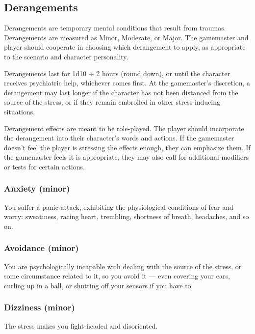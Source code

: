 \subsection{Derangements} \label{sec:derangements} 

Derangements are temporary mental conditions that result from traumas. Derangements are measured as Minor, Moderate, or Major. The gamemaster and player should cooperate in choosing which derangement to apply, as appropriate to the scenario and character personality. 

Derangements last for 1d10 $\div$ 2 hours (round down), or until the character receives psychiatric help, whichever comes first. At the gamemaster’s discretion, a derangement may last longer if the character has not been distanced from the source of the stress, or if they remain embroiled in other stress-inducing situations. 

Derangement effects are meant to be role-played. The player should incorporate the derangement into their character’s words and actions. If the gamemaster doesn’t feel the player is stressing the effects enough, they can emphasize them. If the gamemaster feels it is appropriate, they may also call for additional modifiers or tests for certain actions. 

\subsubsection{Anxiety (minor)} 

You suffer a panic attack, exhibiting the physiological conditions of fear and worry: sweatiness, racing heart, trembling, shortness of breath, headaches, and so on. 

\subsubsection{Avoidance (minor)} 

You are psychologically incapable with dealing with the source of the stress, or some circumstance related to it, so you avoid it --- even covering your ears, curling up in a ball, or shutting off your sensors if you have to. 

\subsubsection{Dizziness (minor)} 

The stress makes you light-headed and disoriented. 

